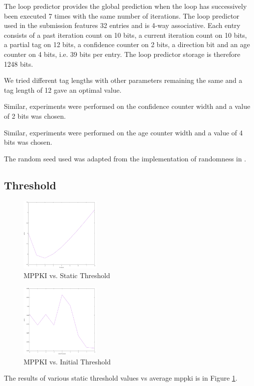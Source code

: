 \documentclass{sig-alternate}
\begin{document}
The loop predictor provides the global prediction when the loop has successively
been executed 7 times with the same number of iterations. The loop predictor
used in the submission features 32 entries and is 4-way associative. Each entry
consists of a past iteration count on 10 bits, a current iteration count on 10
bits, a partial tag on 12 bits, a confidence counter on 2 bits, a direction bit
and an age counter on 4 bits, i.e. 39 bits per entry. The loop predictor storage
is therefore 1248 bits.

We tried different tag lengths with other parameters remaining the same and a
tag length of 12 gave an optimal value.

Similar, experiments were performed on the confidence counter width and a value
of 2 bits was chosen.

Similar, experiments were performed on the age counter width and a value
of 4 bits was chosen.

The random seed used was adapted from the implementation of randomness in
\cite{ltage}.

\subsection{Threshold}

\begin{figure}[h]
  \includegraphics[width=0.35\textwidth]{static-thresh}
  \caption{MPPKI vs. Static Threshold}
  \label{fig-static-thresh}
\end{figure}

\begin{figure}[h]
  \includegraphics[width=0.35\textwidth]{dyn-thresh}
  \caption{MPPKI vs. Initial Threshold}
  \label{fig-dyn-thresh}
\end{figure}
The results of various static threshold values vs average mppki is in Figure
\ref{fig-static-thresh}.
\end{document}
